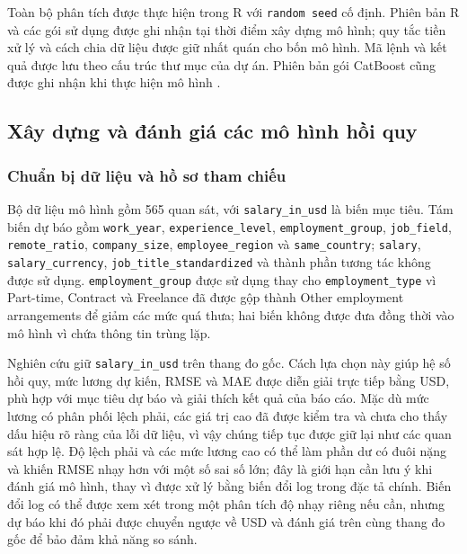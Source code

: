 Toàn bộ phân tích được thực hiện trong R với \texttt{random\ seed} cố
định. Phiên bản R và các gói sử dụng được ghi nhận tại thời điểm xây
dựng mô hình; quy tắc tiền xử lý và cách chia dữ liệu được giữ nhất quán
cho bốn mô hình. Mã lệnh và kết quả được lưu theo cấu trúc thư mục của
dự án. Phiên bản gói CatBoost cũng được ghi nhận khi thực hiện mô hình
\cite{catboost_docs}.

\subsection{Xây dựng và đánh giá các mô hình hồi
quy}\label{nghi:xuxe2y-dux1ef1ng-vuxe0-ux111uxe1nh-giuxe1-cuxe1c-muxf4-huxecnh-hux1ed3i-quy}

\subsubsection{Chuẩn bị dữ liệu và hồ sơ tham
chiếu}\label{nghi:chuux1ea9n-bux1ecb-dux1eef-liux1ec7u-vuxe0-hux1ed3-sux1a1-tham-chiux1ebfu}

Bộ dữ liệu mô hình gồm 565 quan sát, với \texttt{salary\_in\_usd} là
biến mục tiêu. Tám biến dự báo gồm \texttt{work\_year},
\texttt{experience\_level}, \texttt{employment\_group},
\texttt{job\_field}, \texttt{remote\_ratio}, \texttt{company\_size},
\texttt{employee\_region} và \texttt{same\_country}; \texttt{salary},
\texttt{salary\_currency}, \texttt{job\_title\_standardized} và thành
phần tương tác không được sử dụng. \texttt{employment\_group} được sử
dụng thay cho \texttt{employment\_type} vì Part-time, Contract và
Freelance đã được gộp thành Other employment arrangements để giảm các
mức quá thưa; hai biến không được đưa đồng thời vào mô hình vì chứa
thông tin trùng lặp.

Nghiên cứu giữ \texttt{salary\_in\_usd} trên thang đo gốc. Cách lựa chọn
này giúp hệ số hồi quy, mức lương dự kiến, RMSE và MAE được diễn giải
trực tiếp bằng USD, phù hợp với mục tiêu dự báo và giải thích kết quả
của báo cáo. Mặc dù mức lương có phân phối lệch phải, các giá trị cao đã
được kiểm tra và chưa cho thấy dấu hiệu rõ ràng của lỗi dữ liệu, vì vậy
chúng tiếp tục được giữ lại như các quan sát hợp lệ. Độ lệch phải và các
mức lương cao có thể làm phần dư có đuôi nặng và khiến RMSE nhạy hơn với
một số sai số lớn; đây là giới hạn cần lưu ý khi đánh giá mô hình, thay
vì được xử lý bằng biến đổi log trong đặc tả chính. Biến đổi log có thể
được xem xét trong một phân tích độ nhạy riêng nếu cần, nhưng dự báo khi
đó phải được chuyển ngược về USD và đánh giá trên cùng thang đo gốc để
bảo đảm khả năng so sánh.

